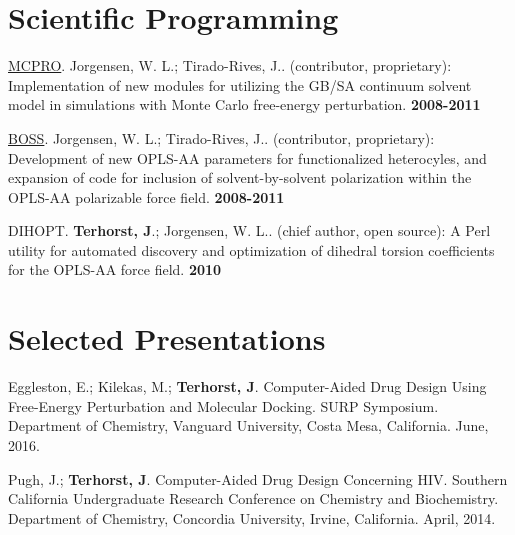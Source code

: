 \documentclass[10pt]{article}
\newcommand*\sciprog[5]{#1. #2. (#3): #4 \textbf{#5}}
\newcommand*\pres[8]{#1 #2. #3. #4, #5, #6. #7, #8.}
\begin{document}
\section{Scientific Programming}

\sciprog{\href{http://zarbi.chem.yale.edu/software.html}{MCPRO}}
{Jorgensen, W. L.; Tirado-Rives, J.}
{contributor, proprietary}
{Implementation of new modules for utilizing the GB/SA continuum solvent 
model in simulations with Monte Carlo free-energy perturbation.}
{2008-2011}

\sciprog{\href{http://zarbi.chem.yale.edu/software.html}{BOSS}}
{Jorgensen, W. L.; Tirado-Rives, J.}
{contributor, proprietary}
{Development of new OPLS-AA parameters for 
functionalized heterocyles, and expansion of code for 
inclusion of solvent-by-solvent polarization within the 
OPLS-AA polarizable force field.}
{2008-2011}

\sciprog{DIHOPT}
{\textbf{Terhorst, J}.; Jorgensen, W. L.}
{chief author, open source}
{A Perl utility for automated discovery and optimization 
of dihedral torsion coefficients for the OPLS-AA force field.}
{2010}


\section{Selected Presentations}


\pres{Eggleston, E.; Kilekas, M.; \textbf{Terhorst, J}.}
{Computer-Aided Drug Design Using Free-Energy Perturbation and Molecular Docking}
{SURP Symposium}
{Department of Chemistry}
{Vanguard University}
{Costa Mesa, California}
{June}{2016}

\pres{Pugh, J.; \textbf{Terhorst, J}.}
{Computer-Aided Drug Design Concerning HIV}
{Southern California Undergraduate Research Conference on Chemistry and Biochemistry}
{Department of Chemistry}
{Concordia University}
{Irvine, California}
{April}{2014}
\end{document}
